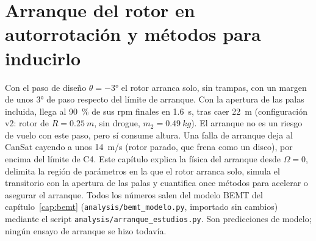 \chapter[Arranque del rotor en autorrotación]{Arranque del rotor en autorrotación y métodos para inducirlo}\label{cap:arranque}

Con el paso de diseño $\theta=\ang{-3}$ el rotor arranca solo, sin trampas, con un margen de
unos \ang{3} de paso respecto del límite de arranque. Con la apertura de las palas incluida,
llega al \SI{90}{\percent} de sus rpm finales en \SI{1.6}{s}, tras caer \SI{22}{m}
(configuración v2: rotor de $R=\SI{0.25}{m}$, sin drogue, $m_2=\SI{0.49}{kg}$). El
arranque no es un riesgo de vuelo con este paso, pero sí consume altura. Una falla de
arranque deja al CanSat cayendo a unos \SI{14}{m/s} (rotor parado, que frena como un
disco), por encima del límite de C4. Este capítulo
explica la física del arranque desde $\Omega=0$, delimita la región de parámetros en la que el
rotor arranca solo, simula el transitorio con la apertura de las palas y cuantifica once
métodos para acelerar o asegurar el arranque. Todos los números salen del modelo BEMT del
capítulo~\ref{cap:bemt} (\texttt{analysis/bemt\_modelo.py}, importado sin cambios) mediante
el script \texttt{analysis/arranque\_estudios.py}. Son predicciones de modelo; ningún ensayo
de arranque se hizo todavía.

